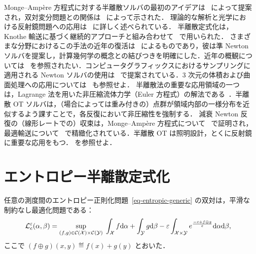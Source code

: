 Monge--Amp\`ere 方程式に対する半離散ソルバの最初のアイデアは~\citet{oliker1989numerical} によって提案され，双対変分問題との関係は~\citet{AurenhammerHA98} によって示された．
%
理論的な解析と光学における反射鏡問題への応用は~\citep{caffarelli1999problem} に詳しく述べられている．
%
半離散定式化は，Knothe 輸送に基づく継続的アプローチと組み合わせて~\citep{carlier2010knothe} で用いられた．
%
さまざまな分野におけるこの手法の近年の復活は~\citet{Merigot11} によるものであり，彼は準 Newton ソルバを提案し，計算幾何学の概念との結びつきを明確にした．近年の概観については~\citep{Levy2017review} を参照されたい．コンピュータグラフィックスにおけるサンプリングに適用される Newton ソルバの使用は~\citep{de2012blue} で提案されている．3 次元の体積および曲面処理への応用については~\citep{levy2015numerical} も参照せよ．
%
半離散法の重要な応用領域の一つは，Lagrange 法を用いた非圧縮流体力学（Euler 方程式）の解法である~\citep{deGoes2015,gallouet2017lagrangian}．半離散 OT ソルバは，（場合によっては重み付きの）点群が領域内部の一様分布を近似するよう課すことで，各反復において非圧縮性を強制する．
%
減衰 Newton 反復の（線形レートでの）収束は，Monge--Amp\`ere 方程式について~\citep{mirebeau2015discretization} で証明され，最適輸送について~\citep{kitagawa2016newton} で精緻化されている．半離散 OT は照明設計，とくに反射鏡に重要な応用をもつ．\citep{merigot2017light} を参照せよ．

\section{エントロピー半離散定式化}
\label{sec-semi-discr-entropy}

任意の測度間のエントロピー正則化問題~\eqref{eq-entropic-generic} の双対は，平滑な制約なし最適化問題である：
\begin{equation}\label{eq-dual-entropic-generic}
	\mathcal{L}_c^\varepsilon(\alpha,\beta) =
	\underset{(f,g) \in \mathcal{C}(\mathcal{X}) \times \mathcal{C}(\mathcal{Y})}{\sup}\;
		 \int_{\mathcal{X}} f\mathrm{d}\alpha + \int_{\mathcal{Y}} g\mathrm{d}\beta
		- \varepsilon \int_{\mathcal{X} \times \mathcal{Y}}  e^{ \frac{-c + f \oplus g }{\varepsilon} } \mathrm{d}\alpha\mathrm{d}\beta,
\end{equation}
ここで $(f\oplus g)(x,y) \eqdef f(x)+g(y)$ とおいた．

